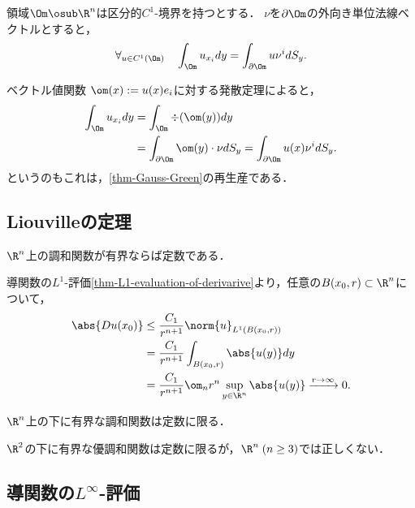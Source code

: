 \documentclass[uplatex,dvipdfmx]{jsreport}
\begin{document}
\begin{lemma}
    領域$\Om\osub\R^n$は区分的$C^1$-境界を持つとする．
    $\nu$を$\partial\Om$の外向き単位法線ベクトルとすると，
    \[\forall_{u\in C^1(\Om)}\quad\int_\Om u_{x_i}dy=\int_{\partial\Om}u\nu^idS_y.\]
\end{lemma}
\begin{Proof}
    ベクトル値関数
    $\om(x):=u(x)e_i$に対する発散定理によると，
    \begin{align*}
        \int_\Om u_{x_i}dy&=\int_\Om\div(\om(y)) dy\\
        &=\int_{\partial\Om}\om(y)\cdot\nu dS_y
        =\int_{\partial\Om}u(x)\nu^idS_y.
    \end{align*}
    というのもこれは，\ref{thm-Gauss-Green}の再生産である．
\end{Proof}

\subsection{Liouvilleの定理}

\begin{corollary}\label{cor-Liouville}
    $\R^n$上の調和関数が有界ならば定数である．
\end{corollary}
\begin{Proof}
    導関数の$L^1$-評価\ref{thm-L1-evaluation-of-derivarive}より，任意の$B(x_0,r)\subset\R^n$について，
    \begin{align*}
        \abs{Du(x_0)}&\le\frac{C_1}{r^{n+1}}\norm{u}_{L^1(B(x_0,r))}\\
        &=\frac{C_1}{r^{n+1}}\int_{B(x_0,r)}\abs{u(y)}dy\\
        &=\frac{C_1}{r^{n+1}}\om_nr^n\sup_{y\in\R^n}\abs{u(y)}\xrightarrow{r\to\infty}0.
    \end{align*}
\end{Proof}

\begin{proposition}
    $\R^n$上の下に有界な調和関数は定数に限る．
\end{proposition}
\begin{remark}
    $\R^2$の下に有界な優調和関数は定数に限るが，$\R^n\;(n\ge3)$では正しくない．
\end{remark}

\subsection{導関数の$L^\infty$-評価}
\end{document}
